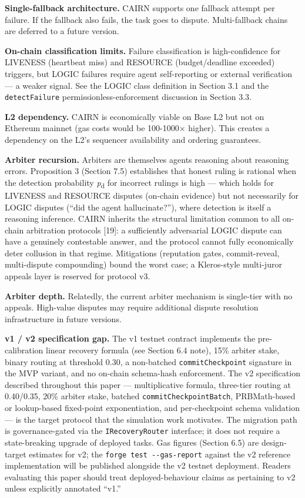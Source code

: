 \documentclass[
  10pt,
]{article}
\begin{document}
\textbf{Single-fallback architecture.} CAIRN supports one fallback
attempt per failure. If the fallback also fails, the task goes to
dispute. Multi-fallback chains are deferred to a future version.

\textbf{On-chain classification limits.} Failure classification is
high-confidence for LIVENESS (heartbeat miss) and RESOURCE
(budget/deadline exceeded) triggers, but LOGIC failures require agent
self-reporting or external verification --- a weaker signal. See the
LOGIC class definition in Section 3.1 and the \texttt{detectFailure}
permissionless-enforcement discussion in Section 3.3.

\textbf{L2 dependency.} CAIRN is economically viable on Base L2 but not
on Ethereum mainnet (gas costs would be 100-1000× higher). This creates
a dependency on the L2's sequencer availability and ordering guarantees.

\textbf{Arbiter recursion.} Arbiters are themselves agents reasoning
about reasoning errors. Proposition 3 (Section 7.5) establishes that
honest ruling is rational when the detection probability
\emph{p}\textsubscript{d} for incorrect rulings is high --- which holds
for LIVENESS and RESOURCE disputes (on-chain evidence) but not
necessarily for LOGIC disputes (``did the agent hallucinate?''), where
detection is itself a reasoning inference. CAIRN inherits the structural
limitation common to all on-chain arbitration protocols {[}19{]}: a
sufficiently adversarial LOGIC dispute can have a genuinely contestable
answer, and the protocol cannot fully economically deter collusion in
that regime. Mitigations (reputation gates, commit-reveal, multi-dispute
compounding) bound the worst case; a Kleros-style multi-juror appeals
layer is reserved for protocol v3.

\textbf{Arbiter depth.} Relatedly, the current arbiter mechanism is
single-tier with no appeals. High-value disputes may require additional
dispute resolution infrastructure in future versions.

\textbf{v1 / v2 specification gap.} The v1 testnet contract implements
the pre-calibration linear recovery formula (see Section 6.4 note), 15\%
arbiter stake, binary routing at threshold 0.30, a non-batched
\texttt{commitCheckpoint} signature in the MVP variant, and no on-chain
schema-hash enforcement. The v2 specification described throughout this
paper --- multiplicative formula, three-tier routing at 0.40/0.35, 20\%
arbiter stake, batched \texttt{commitCheckpointBatch}, PRBMath-based or
lookup-based fixed-point exponentiation, and per-checkpoint schema
validation --- is the target protocol that the simulation work
motivates. The migration path is governance-gated via the
\texttt{IRecoveryRouter} interface; it does not require a state-breaking
upgrade of deployed tasks. Gas figures (Section 6.5) are design-target
estimates for v2; the \texttt{forge\ test\ -\/-gas-report} against the
v2 reference implementation will be published alongside the v2 testnet
deployment. Readers evaluating this paper should treat
deployed-behaviour claims as pertaining to v2 unless explicitly
annotated ``v1.''
\end{document}
